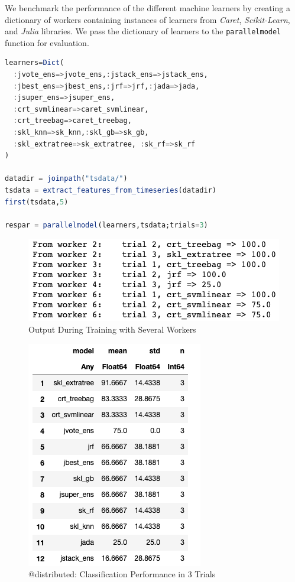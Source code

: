 \documentclass{juliacon}
\begin{document}
We benchmark the performance of the different machine learners by creating a dictionary of workers containing instances of learners from \emph{Caret}, \emph{Scikit-Learn}, and \emph{Julia} libraries. We pass the dictionary of learners to the \texttt{parallelmodel} function for evaluation.

\begin{lstlisting}[language = Julia]
learners=Dict(
  :jvote_ens=>jvote_ens,:jstack_ens=>jstack_ens,
  :jbest_ens=>jbest_ens,:jrf=>jrf,:jada=>jada,
  :jsuper_ens=>jsuper_ens, 
  :crt_svmlinear=>caret_svmlinear,
  :crt_treebag=>caret_treebag,
  :skl_knn=>sk_knn,:skl_gb=>sk_gb,
  :skl_extratree=>sk_extratree, :sk_rf=>sk_rf
)

datadir = joinpath("tsdata/")
tsdata = extract_features_from_timeseries(datadir)
first(tsdata,5)

respar = parallelmodel(learners,tsdata;trials=3)
\end{lstlisting}

\begin{figure}[htbp]
   \centering
   \includegraphics[width=0.8\columnwidth]{sim.png} %
   \caption{Output During Training with Several Workers}
   \label{fig:sim}
\end{figure}

\begin{figure}[htbp]
   \centering
   \includegraphics[width=0.6\columnwidth]{results.png} %
   \caption{@distributed: Classification Performance in 3 Trials}
   \label{fig:performance}
\end{figure}
\end{document}

